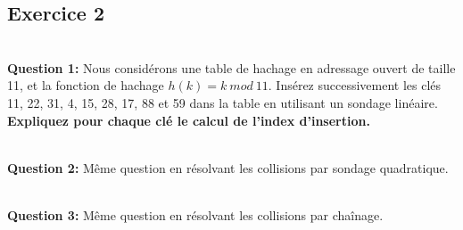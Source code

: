 \documentclass[a4paper, 10pt]{ustl-tdtp}
\begin{document}
\subsection*{Exercice 2}

~\\ \textbf{Question 1:} Nous considérons une table de hachage en adressage ouvert de taille 11, et la fonction de hachage $h(k) = k~mod~11$. Insérez successivement les clés 11, 22, 31, 4, 15, 28, 17, 88 et 59 dans la table en utilisant un sondage linéaire. \textbf{Expliquez pour chaque clé le calcul de l'index d'insertion.}


~\\ \textbf{Question 2:} Même question en résolvant les collisions par sondage quadratique.


~\\ \textbf{Question 3:} Même question en résolvant les collisions par chaînage.

\end{document}
